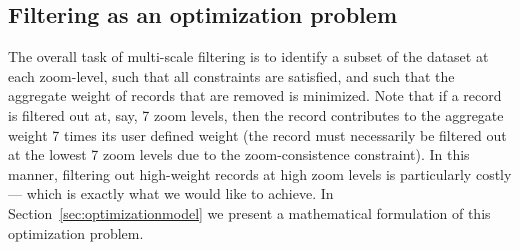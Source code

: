 \subsection{Filtering as an optimization problem}
\label{sec:filtering}

The overall task of multi-scale filtering is to identify a subset of the dataset at each zoom-level, such that all constraints are satisfied, and such that the aggregate weight of records that are removed is minimized. Note that if a record is filtered out at, say, 7 zoom levels, then the record contributes to the aggregate weight 7 times its user defined weight (the record must necessarily be filtered out at the lowest 7 zoom levels due to the zoom-consistence constraint). In this manner, filtering out high-weight records at high zoom levels is particularly costly --- which is exactly what we would like to achieve. In Section~\ref{sec:optimizationmodel} we present a mathematical formulation of this optimization problem.




